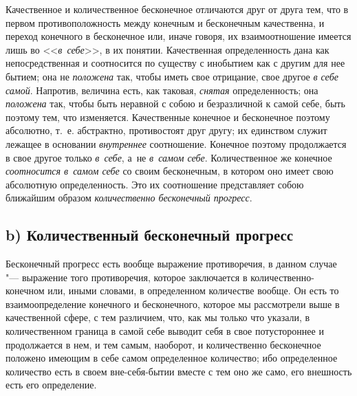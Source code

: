 Качественное и количественное бесконечное отличаются друг от друга тем, что
в первом противоположность между конечным и бесконечным качественна, и переход
конечного в бесконечное или, иначе говоря, их взаимоотношение имеется лишь во
<<{\em в~себе}>>, в их понятии. Качественная определенность дана как
непосредственная и соотносится по существу с инобытием как с другим для нее
бытием; она не {\em положена} так, чтобы иметь свое отрицание, свое другое
{\em в себе самой}. Напротив, величина есть, как таковая, {\em снятая}
определенность; она {\em положена} так, чтобы быть неравной с собою и
безразличной к самой себе, быть поэтому тем, что изменяется. Качественные
конечное и бесконечное поэтому абсолютно, т.~е. абстрактно, противостоят друг
другу; их единством служит лежащее в основании {\em внутреннее} соотношение.
Конечное поэтому продолжается в свое другое только {\em в~себе}, а~не
{\em в~самом себе}. Количественное же конечное {\em соотносится в~самом себе}
со своим бесконечным, в котором оно имеет свою абсолютную определенность. Это
их соотношение представляет собою ближайшим образом
{\em количественно бесконечный прогресс}.

\subsection[b) Количественный бесконечный прогресс]%
{b) Количественный бесконечный прогресс}

Бесконечный прогресс есть вообще выражение противоречия, в данном случае "---
выражение того противоречия, которое заключается в количественно-конечном или,
иными словами, в определенном количестве вообще. Он есть то взаимоопределение
конечного и бесконечного, которое мы рассмотрели выше в качественной сфере,
с тем различием, что, как мы только что указали, в количественном граница
в самой себе выводит себя в свое потустороннее и продолжается в нем, и тем
самым, наоборот, и количественно бесконечное положено имеющим в себе самом
определенное количество; ибо определенное количество есть в своем
вне-себя-бытии вместе с тем оно же само, его внешность есть его определение.


